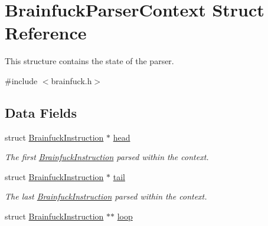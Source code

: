 \hypertarget{structBrainfuckParserContext}{}\section{Brainfuck\+Parser\+Context Struct Reference}
\label{structBrainfuckParserContext}


This structure contains the state of the parser.  




{\ttfamily \#include $<$brainfuck.\+h$>$}

\subsection*{Data Fields}
\begin{DoxyCompactItemize}
\item 
\hypertarget{structBrainfuckParserContext_a07a4631a3667e742c9cd93b60f2d0450}{}struct \hyperlink{structBrainfuckInstruction}{Brainfuck\+Instruction} $\ast$ \hyperlink{structBrainfuckParserContext_a07a4631a3667e742c9cd93b60f2d0450}{head}\label{structBrainfuckParserContext_a07a4631a3667e742c9cd93b60f2d0450}

\begin{DoxyCompactList}\small\item\em The first \hyperlink{structBrainfuckInstruction}{Brainfuck\+Instruction} parsed within the context. \end{DoxyCompactList}\item 
\hypertarget{structBrainfuckParserContext_a5d4d1fbe933d9994b3cdf8a3467c7a6e}{}struct \hyperlink{structBrainfuckInstruction}{Brainfuck\+Instruction} $\ast$ \hyperlink{structBrainfuckParserContext_a5d4d1fbe933d9994b3cdf8a3467c7a6e}{tail}\label{structBrainfuckParserContext_a5d4d1fbe933d9994b3cdf8a3467c7a6e}

\begin{DoxyCompactList}\small\item\em The last \hyperlink{structBrainfuckInstruction}{Brainfuck\+Instruction} parsed within the context. \end{DoxyCompactList}\item 
\hypertarget{structBrainfuckParserContext_a948e713cb85e2a9fb300ddb79f437515}{}struct \hyperlink{structBrainfuckInstruction}{Brainfuck\+Instruction} $\ast$$\ast$ \hyperlink{structBrainfuckParserContext_a948e713cb85e2a9fb300ddb79f437515}{loop}\label{structBrainfuckParserContext_a948e713cb85e2a9fb300ddb79f437515}


\end{DoxyCompactItemize}
